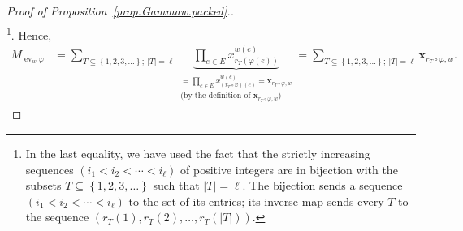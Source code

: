 \documentclass[12pt]{article}
\theoremstyle{plain}
\theoremstyle{definition}
\theoremstyle{remark}
\let\sumnonlimits\sum
\let\prodnonlimits\prod
\renewcommand{\sum}{\sumnonlimits\limits}
\renewcommand{\prod}{\prodnonlimits\limits}
\newcommand{\xx}{{\mathbf{x}}}
\newcommand{\ev}{\operatorname{ev}}
\begin{document}
\begin{proof}[Proof of Proposition~\ref{prop.Gammaw.packed}.]
\begin{align}
\nonumber
\end{align}
\footnote{In the last equality, we have used the fact that
the strictly increasing sequences
$\left(i_1 < i_2 < \cdots < i_\ell\right)$ of positive integers are
in bijection with the subsets
$T \subseteq \left\{1, 2, 3, \ldots\right\}$
such that $\left|T\right| = \ell$. The bijection sends a sequence
$\left(i_1 < i_2 < \cdots < i_\ell\right)$ to the set of its entries;
its inverse map sends every $T$ to the sequence
$\left(r_T\left(1\right), r_T\left(2\right), \ldots,
r_T\left(\left|T\right|\right)\right)$.}. Hence,
\begin{align}
M_{\ev_w \varphi}
&= \sum_{T \subseteq \left\{1, 2, 3, \ldots\right\} ; \ \left|T\right| = \ell}
\underbrace{\prod_{e \in E} x_{r_T\left(\varphi\left(e\right)\right)}^{w\left(e\right)}}
           _{\substack{
              = \prod_{e \in E} x_{\left(r_T\circ \varphi\right)\left(e\right)}^{w\left(e\right)}
              = \xx_{r_T\circ\varphi,w} \\
              \text{(by the definition of } \xx_{r_T\circ\varphi,w} \text{)}
             }}
= \sum_{T \subseteq \left\{1, 2, 3, \ldots\right\} ; \ \left|T\right| = \ell}
\xx_{r_T\circ\varphi,w} .
\label{pf.prop.Gammaw.packed.1.pf.1}
\end{align}


\end{proof}
\end{document}
